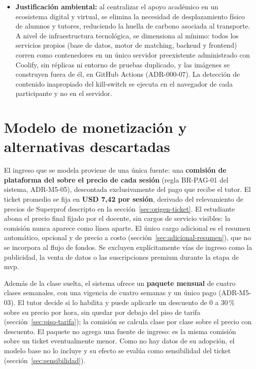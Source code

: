\begin{itemize}
          como el proyecto final de la carrera de Ingeniería en
          Informática, demostrando la aplicación de tecnologías de
          vanguardia (\gls{ia} y \gls{webrtc}) para resolver una
          problemática concreta del sistema educativo argentino.
    \item \textbf{Justificación ambiental:} al centralizar el apoyo
          académico en un ecosistema digital y virtual, se elimina la
          necesidad de desplazamiento físico de alumnos y tutores,
          reduciendo la huella de carbono asociada al transporte. A nivel
          de infraestructura tecnológica, se dimensiona al mínimo: todos
          los servicios propios (base de datos, motor de \gls{matching},
          backend y frontend) corren como contenedores en un único servidor
          preexistente administrado con Coolify, sin réplicas ni entorno de
          pruebas duplicado, y las imágenes se construyen fuera de él, en
          GitHub Actions (ADR-000-07). La detección de contenido inapropiado
          del kill-switch se ejecuta en el navegador de cada participante y
          no en el servidor.
\end{itemize}

\section{Modelo de monetización y alternativas descartadas}

El ingreso que se modela proviene de una única fuente: una
\textbf{comisión de plataforma del \comision{} sobre el precio de cada
sesión} (regla BR-PAG-01 del sistema, ADR-M5-05), descontada
exclusivamente del pago que recibe el tutor. El ticket promedio se fija en
\textbf{USD 7,42 por sesión}, derivado del relevamiento de precios de
Superprof descripto en la sección~\ref{sec:origen-ticket}. El estudiante
abona el precio final fijado por el docente, sin cargos de servicio
visibles: la comisión nunca aparece como línea aparte. El único cargo
adicional es el resumen automático, opcional y de precio a costo
(sección~\ref{sec:adicional-resumen}), que no se incorpora al flujo de
fondos. Se excluyen explícitamente vías de ingreso como la publicidad, la
venta de datos o las suscripciones premium durante la etapa de \gls{mvp}.

Además de la clase suelta, el sistema ofrece un \textbf{paquete mensual}
de cuatro clases semanales, con una vigencia de cuatro semanas y un único
pago (ADR-M5-03). El tutor decide si lo habilita y puede aplicarle un
descuento de 0 a 30\,\% sobre su precio por hora, sin quedar por debajo
del piso de tarifa (sección~\ref{sec:piso-tarifa}); la comisión se calcula
clase por clase sobre el precio con descuento. El paquete no agrega una
fuente de ingreso: es la misma comisión sobre un ticket eventualmente
menor. Como no hay datos de su adopción, el modelo base no lo incluye y su
efecto se evalúa como sensibilidad del ticket
(sección~\ref{sec:sensibilidad}).

